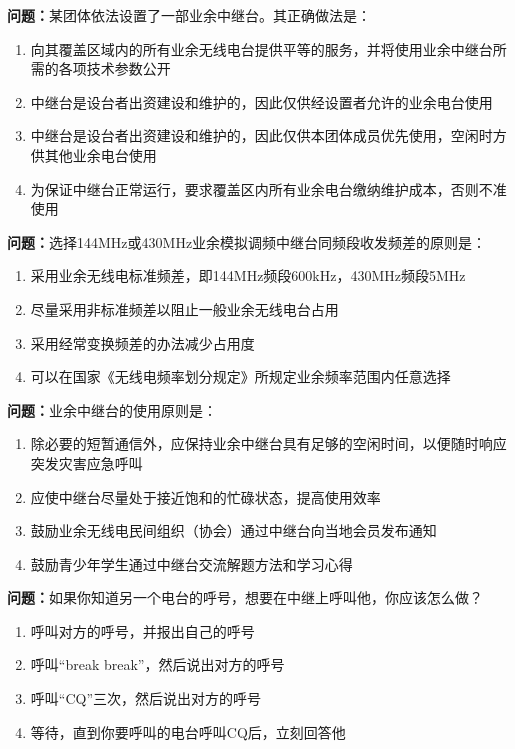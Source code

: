 \textbf{问题：}某团体依法设置了一部业余中继台。其正确做法是：
\begin{enumerate}[label=\Alph*), leftmargin=1cm]
	\item 向其覆盖区域内的所有业余无线电台提供平等的服务，并将使用业余中继台所需的各项技术参数公开
	\item 中继台是设台者出资建设和维护的，因此仅供经设置者允许的业余电台使用
	\item 中继台是设台者出资建设和维护的，因此仅供本团体成员优先使用，空闲时方供其他业余电台使用
	\item 为保证中继台正常运行，要求覆盖区内所有业余电台缴纳维护成本，否则不准使用
\end{enumerate}

\textbf{问题：}选择144MHz或430MHz业余模拟调频中继台同频段收发频差的原则是：
\begin{enumerate}[label=\Alph*), leftmargin=1cm]
	\item 采用业余无线电标准频差，即144MHz频段600kHz，430MHz频段5MHz
	\item 尽量采用非标准频差以阻止一般业余无线电台占用
	\item 采用经常变换频差的办法减少占用度
	\item 可以在国家《无线电频率划分规定》所规定业余频率范围内任意选择
\end{enumerate}

\textbf{问题：}业余中继台的使用原则是：
\begin{enumerate}[label=\Alph*), leftmargin=1cm]
	\item 除必要的短暂通信外，应保持业余中继台具有足够的空闲时间，以便随时响应突发灾害应急呼叫
	\item 应使中继台尽量处于接近饱和的忙碌状态，提高使用效率
	\item 鼓励业余无线电民间组织（协会）通过中继台向当地会员发布通知
	\item 鼓励青少年学生通过中继台交流解题方法和学习心得
\end{enumerate}

\textbf{问题：}如果你知道另一个电台的呼号，想要在中继上呼叫他，你应该怎么做？
\begin{enumerate}[label=\Alph*), leftmargin=1cm]
	\item 呼叫对方的呼号，并报出自己的呼号
	\item 呼叫“break break”，然后说出对方的呼号
	\item 呼叫“CQ”三次，然后说出对方的呼号
	\item 等待，直到你要呼叫的电台呼叫CQ后，立刻回答他
\end{enumerate}


